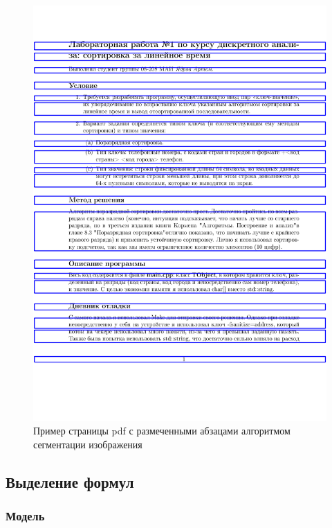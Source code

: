 \begin{figure}
    \includegraphics[scale=0.15]{img/paragraph/pdf_like_img_output.png}
    \caption{Пример страницы pdf с размеченными абзацами алгоритмом сегментации изображения}
    \label{img_segmentation_output_pdf}
\end{figure}


\subsection{Выделение формул}
\subsubsection{Модель}

